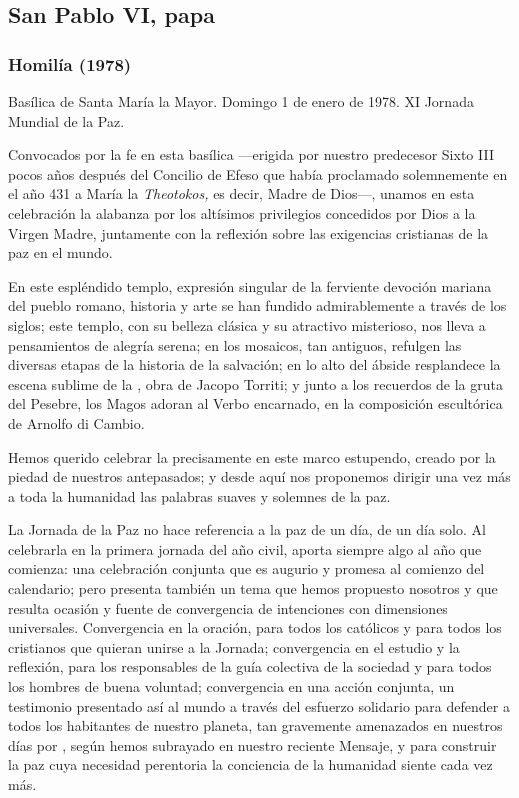 \begin{body}
\begin{body}
\subsection{San Pablo VI, papa}
\subsubsection{Homilía (1978)}
Basílica de Santa María la Mayor. Domingo 1 de enero de 1978. XI Jornada Mundial de la Paz.

Convocados por la fe en esta basílica ---erigida por nuestro predecesor Sixto III pocos años después del Concilio de Efeso que había proclamado solemnemente en el año 431 a María la \emph{Theotokos,} es decir, Madre de Dios---, unamos en esta celebración la alabanza por los altísimos privilegios concedidos por Dios a la Virgen Madre, juntamente con la reflexión sobre las exigencias cristianas de la paz en el mundo.

En este espléndido templo, expresión singular de la ferviente devoción mariana del pueblo romano, historia y arte se han fundido admirablemente a través de los siglos; este templo, con su belleza clásica y su atractivo misterioso, nos lleva a pensamientos de alegría serena; en los mosaicos, tan antiguos, refulgen las diversas etapas de la historia de la salvación; en lo alto del ábside resplandece la escena sublime de la , obra de Jacopo Torriti; y junto a los recuerdos de la gruta del Pesebre, los Magos adoran al Verbo encarnado, en la composición escultórica de Arnolfo di Cambio.

Hemos querido celebrar la  precisamente en este marco estupendo, creado por la piedad de nuestros antepasados; y desde aquí nos proponemos dirigir una vez más a toda la humanidad las palabras suaves y solemnes de la paz.

La Jornada de la Paz no hace referencia a la paz de un día, de un día solo. Al celebrarla en la primera jornada del año civil, aporta siempre algo al año que comienza: una celebración conjunta que es augurio y promesa al comienzo del calendario; pero presenta también un tema que hemos propuesto nosotros y que resulta ocasión y fuente de convergencia de intenciones con dimensiones universales. Convergencia en la oración, para todos los católicos y para todos los cristianos que quieran unirse a la Jornada; convergencia en el estudio y la reflexión, para los responsables de la guía colectiva de la sociedad y para todos los hombres de buena voluntad; convergencia en una acción conjunta, un testimonio presentado así al mundo a través del esfuerzo solidario para defender a todos los habitantes de nuestro planeta, tan gravemente amenazados en nuestros días por , según hemos subrayado en nuestro reciente Mensaje, y para construir la paz cuya necesidad perentoria la conciencia de la humanidad siente cada vez más.


\end{body}
\end{body}
